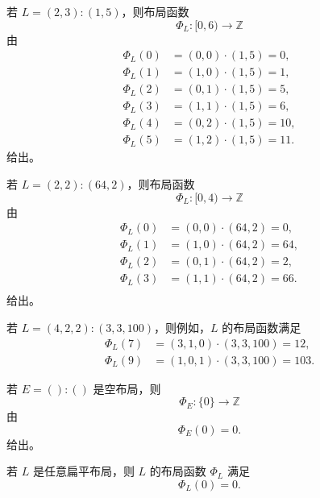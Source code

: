 \begin{example}\label{layoutfunctionexample1}
    若 $L = (2,3):(1,5)$，则布局函数
    \[
    \Phi_L:[0,6) \to \mathbb{Z}
    \]
    由
    \begin{align*}
    \Phi_L(0) & = (0,0) \cdot (1,5) = 0,\\
    \Phi_L(1) & = (1,0) \cdot (1,5) = 1,\\
    \Phi_L(2) & = (0,1) \cdot (1,5) = 5,\\
    \Phi_L(3) & = (1,1) \cdot (1,5) = 6,\\
    \Phi_L(4) & = (0,2) \cdot (1,5) = 10,\\
    \Phi_L(5) & = (1,2) \cdot (1,5) = 11.
    \end{align*}
    给出。
\end{example}

\begin{example}\label{layoutfunctionexample1}
    若 $L = (2,2):(64,2)$，则布局函数
    \[
    \Phi_L:[0,4) \to \mathbb{Z}
    \]
    由
    \begin{align*}
    \Phi_L(0) & = (0,0) \cdot (64,2) = 0,\\
    \Phi_L(1) & = (1,0) \cdot (64,2) = 64,\\
    \Phi_L(2) & = (0,1) \cdot (64,2) = 2,\\
    \Phi_L(3) & = (1,1) \cdot (64,2) = 66.\\
    \end{align*}
    给出。
\end{example}

\begin{example}\label{layoutfunctionexample2}
    若 $L = (4,2,2):(3,3,100)$，则例如，$L$ 的布局函数满足
    \begin{align*}
    \Phi_L(7) & = (3,1,0) \cdot (3,3,100) = 12\text{,}\\
    \Phi_L(9) & = (1,0,1) \cdot (3,3,100) = 103.
    \end{align*}
\end{example}
\begin{example}
    若 $E = ():()$ 是空布局，则
    \[
    \Phi_E:\{0\} \to \mathbb{Z}
    \]
    由
    \[
    \Phi_E(0) = 0.
    \]
    给出。
\end{example}

\begin{example}
    若 $L$ 是任意扁平布局，则 $L$ 的布局函数 $\Phi_L$ 满足
    \[
    \Phi_L(0) = 0.
    \]
\end{example}

